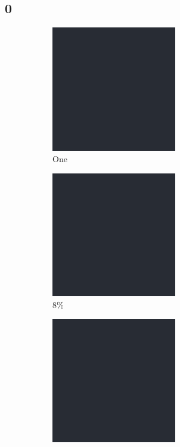 \documentclass[12pt, fleqn]{report}                             %
\theoremstyle{break}                                            %
\begin{document}
      \subsection{0}
      \begin{figure}[ht!]
        \centering
        \begin{subfigure}[b]{0.4\linewidth}
          \includegraphics[width=0.6\textwidth]{Images/0/a.png}
          \caption{One}
        \end{subfigure}
        \begin{subfigure}[b]{0.4\linewidth}
          \includegraphics[width=0.6\textwidth]{Images/0/b.png}
          \caption{8\%}
        \end{subfigure}
        \begin{subfigure}[b]{0.4\linewidth}
          \includegraphics[width=0.6\textwidth]{Images/0/c.png}

\end{subfigure}
\end{figure}
\end{document}
